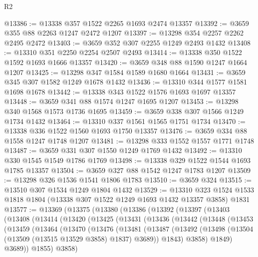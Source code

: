 \begin{lexlean}{R2}
\begin{coremodule}
@13386 := @13338 @357 @1522 @2265 @1693 @2474 @13357
@13392 := @3659 @355 @88 @2263 @1247 @2472 @1207
@13397 := @13298 @354 @2257 @2262 @2495 @2472
@13403 := @3659 @352 @307 @2255 @1249 @2493 @1432
@13408 := @13310 @351 @2250 @2254 @2507 @2493
@13414 := @13338 @350 @1522 @1592 @1693 @1666 @13357
@13420 := @3659 @348 @88 @1590 @1247 @1664 @1207
@13425 := @13298 @347 @1584 @1589 @1680 @1664
@13431 := @3659 @345 @307 @1582 @1249 @1678 @1432
@13436 := @13310 @344 @1577 @1581 @1698 @1678
@13442 := @13338 @343 @1522 @1576 @1693 @1697 @13357
@13448 := @3659 @341 @88 @1574 @1247 @1695 @1207
@13453 := @13298 @340 @1568 @1573 @1736 @1695
@13459 := @3659 @338 @307 @1566 @1249 @1734 @1432
@13464 := @13310 @337 @1561 @1565 @1751 @1734
@13470 := @13338 @336 @1522 @1560 @1693 @1750 @13357
@13476 := @3659 @334 @88 @1558 @1247 @1748 @1207
@13481 := @13298 @333 @1552 @1557 @1771 @1748
@13487 := @3659 @331 @307 @1550 @1249 @1769 @1432
@13492 := @13310 @330 @1545 @1549 @1786 @1769
@13498 := @13338 @329 @1522 @1544 @1693 @1785 @13357
@13504 := @3659 @327 @88 @1542 @1247 @1783 @1207
@13509 := @13298 @326 @1536 @1541 @1806 @1783
@13510 := @3659 @324
@13515 := @13510 @307 @1534 @1249 @1804 @1432
@13529 := @13310
    @323
    @1524
    @1533
    @1818
    @1804
    (@13338 @307 @1522 @1249 @1693 @1432 @13357 @3858)
    @1831
@13577 := @13369
    (@13375
      (@13380
        (@13386
          (@13392
            (@13397
              (@13403
                (@13408
                  (@13414
                    (@13420
                      (@13425
                        (@13431
                          (@13436
                            (@13442
                              (@13448
                                (@13453
                                  (@13459
                                    (@13464
                                      (@13470
                                        (@13476
                                          (@13481
                                            (@13487
                                              (@13492
                                                (@13498
                                                  (@13504
                                                    (@13509 (@13515 @13529 @3858) @1837)
                                                    @3689))
                                                @1843)
                                              @3858)
                                            @1849)
                                          @3689))
                                      @1855)
                                    @3858)

\end{coremodule}
\end{lexlean}
